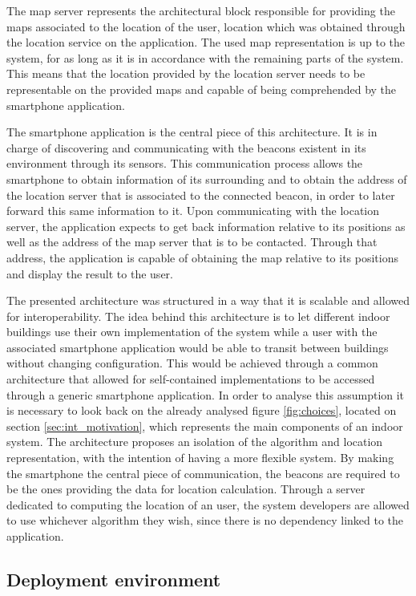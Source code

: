  
The map server represents the architectural block responsible for providing the maps associated to the location of the user, location which was obtained through the location service on the application. The used map representation is up to the system, for as long as it is in accordance with the remaining parts of the system. This means that the location provided by the location server needs to be representable on the provided maps and capable of being comprehended by the smartphone application.  
 
 
The smartphone application is the central piece of this architecture. It is in charge of discovering and communicating with the beacons existent in its environment through its sensors. This communication process allows the smartphone to obtain information of its surrounding and to obtain the address of the location server that is associated to the connected beacon, in order to later forward this same information to it. Upon communicating with the location server, the application expects to get back information relative to its positions as well as the address of the map server that is to be contacted. Through that address, the application is capable of obtaining the map relative to its positions and display the result to the user. 
 
 
The presented architecture was structured in a way that it is scalable and allowed for interoperability. The idea behind this architecture is to let different indoor buildings use their own implementation of the system while a user with the associated smartphone application would be able to transit between buildings without changing configuration. This would be achieved through a common architecture that allowed for self-contained implementations to be accessed through a generic smartphone application. In order to analyse this assumption it is necessary to look back on the already analysed figure \ref{fig:choices}, located on section \ref{sec:int_motivation}, which represents the main components of an indoor system. The architecture proposes an isolation of the algorithm and location representation, with the intention of having a more flexible system. By making the smartphone the central piece of communication, the beacons are required to be the ones providing the data for location calculation. Through a server dedicated to computing the location of an user, the system developers are allowed to use whichever algorithm they wish, since there is no dependency linked to the application.  
 
 
\subsection{Deployment environment} 
\label{subsec:deployment} 
 
